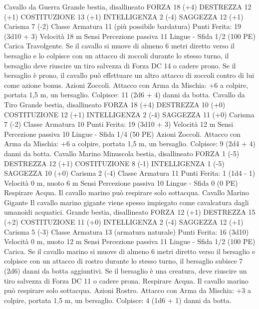\begin{multicols}{2}
Cavallo da Guerra
Grande bestia, disallineato
FORZA 18 (+4)
DESTREZZA 12 (+1)
COSTITUZIONE 13 (+1)
INTELLIGENZA 2 (-4)
SAGGEZZA 12 (+1)
Carisma 7 (-2)
Classe Armatura 11 (più possibile bardatura)
\hspace*{0pt}\hfill{Punti Ferita}: 19 (3d10 + 3)
Velocità 18 m
Sensi Percezione passiva 11
Lingue -
Sfida 1/2 (100 PE)
Carica Travolgente. Se il cavallo si muove di almeno 6 metri diretto
verso il bersaglio e lo colpisce con un attacco di zoccoli durante lo
stesso turno, il bersaglio deve riuscire un tiro salvezza di Forza DC
14 o cadere prono. Se il bersaglio è prono, il cavallo può effettuare
un altro attacco di zoccoli contro di lui come azione bonus.
Azioni
Zoccoli. Attacco con Arma da Mischia: +6 a colpire, portata 1,5
m, un bersaglio.
Colpisce: 11 (2d6 + 4) danni da botta.
Cavallo da Tiro
Grande bestia, disallineato
FORZA 18 (+4)
DESTREZZA 10 (+0)
COSTITUZIONE 12 (+1)
INTELLIGENZA 2 (-4)
SAGGEZZA 11 (+0)
Carisma 7 (-2)
Classe Armatura 10
\hspace*{0pt}\hfill{Punti Ferita}: 19 (3d10 + 3)
Velocità 12 m
Sensi Percezione passiva 10
Lingue -
Sfida 1/4 (50 PE)
Azioni
Zoccoli. Attacco con Arma da Mischia: +6 a colpire, portata 1,5
m, un bersaglio.
Colpisce: 9 (2d4 + 4) danni da botta.
Cavallo Marino
Minuscola bestia, disallineato
FORZA 1 (-5)
DESTREZZA 12 (+1)
COSTITUZIONE 8 (-1)
INTELLIGENZA 1 (-5)
SAGGEZZA 10 (+0)
Carisma 2 (-4)
Classe Armatura 11
\hspace*{0pt}\hfill{Punti Ferita}: 1 (1d4 - 1)
Velocità 0 m, nuoto 6 m
Sensi Percezione passiva 10
Lingue -
Sfida 0 (0 PE)
Respirare Acqua. Il cavallo marino può respirare solo sottacqua.
Cavallo Marino Gigante
Il cavallo marino gigante viene spesso impiegato come
cavalcatura dagli umanoidi acquatici.
Grande bestia, disallineato
FORZA 12 (+1)
DESTREZZA 15 (+2)
COSTITUZIONE 11 (+0)
INTELLIGENZA 2 (-4)
SAGGEZZA 12 (+1)
Carisma 5 (-3)
Classe Armatura 13 (armatura naturale)
\hspace*{0pt}\hfill{Punti Ferita}: 16 (3d10)
Velocità 0 m, nuoto 12 m
Sensi Percezione passiva 11
Lingue -
Sfida 1/2 (100 PE)
Carica. Se il cavallo marino si muove di almeno 6 metri diretto
verso il bersaglio e colpisce con un attacco di rostro durante lo
stesso turno, il bersaglio subisce 7 (2d6) danni da botta
aggiuntivi. Se il bersaglio è una creatura, deve riuscire un tiro
salvezza di Forza DC 11 o cadere prona.
Respirare Acqua. Il cavallo marino può respirare solo sottacqua.
Azioni
Rostro. Attacco con Arma da Mischia: +3 a colpire, portata 1,5
m, un bersaglio.
Colpisce: 4 (1d6 + 1) danni da botta. 

\end{multicols}
